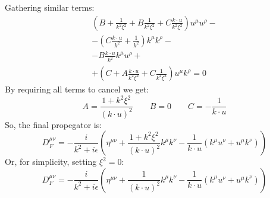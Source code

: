 \documentclass{article}
\begin{document}
Gathering similar terms:
\begin{equation}
\begin{gathered}
    \left(B + \frac{1}{k^2\xi^2} + B \frac{1}{k^2\xi^2} + C \frac{k\cdot u}{k^2\xi^2}\right)u^\mu u^\rho
    - \\ -
    \left(C \frac{k\cdot u}{k^2} + \frac{1}{k^2}\right) k^\mu k^\rho
    - \\ -
    B \frac{k\cdot u}{k^2} k^\mu u^\rho
    + \\ +
    \left(C + A \frac{k\cdot u}{k^2\xi^2} + C \frac{1}{k^2\xi^2}\right) u^\mu k^\rho
    = 0
\end{gathered}
\end{equation}
By requiring all terms to cancel we get:
\begin{equation}
    A = \frac{1 + k^2\xi^2}{(k\cdot u)^2}
    \qquad
    B = 0
    \qquad
    C = -\frac{1}{k\cdot u}
\end{equation}
So, the final propegator is:
\begin{equation}
    D_F^{\mu\nu} = -\frac{i}{k^2 + i\epsilon} \left(\eta^{\mu\nu} + \frac{1 + k^2\xi^2}{(k\cdot u)^2} k^{\mu}k^{\nu} - \frac{1}{k\cdot u} (k^{\mu}u^{\nu} + u^{\mu}k^{\nu})\right)
\end{equation}
Or, for simplicity, setting $\xi^2 = 0$:
\begin{equation}
    D_F^{\mu\nu} = -\frac{i}{k^2 + i\epsilon} \left(\eta^{\mu\nu} + \frac{1}{(k\cdot u)^2} k^{\mu}k^{\nu} - \frac{1}{k\cdot u} (k^{\mu}u^{\nu} + u^{\mu}k^{\nu})\right)
\end{equation}
\end{document}

